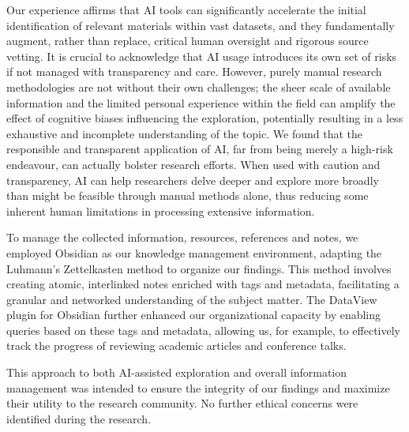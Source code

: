 Our experience affirms that AI tools can significantly accelerate the initial identification of relevant materials within vast datasets, and they fundamentally augment, rather than replace, critical human oversight and rigorous source vetting. It is crucial to acknowledge that AI usage introduces its own set of risks if not managed with transparency and care. However, purely manual research methodologies are not without their own challenges; the sheer scale of available information and the limited personal experience within the field can amplify the effect of cognitive biases\cite{cognitive-biases} influencing the exploration, potentially resulting in a less exhaustive and incomplete understanding of the topic. We found that the responsible and transparent application of AI, far from being merely a high-risk endeavour, can actually bolster research efforts. When used with caution and transparency, AI can help researchers delve deeper and explore more broadly than might be feasible through manual methods alone, thus reducing some inherent human limitations in processing extensive information.

To manage the collected information, resources, references and notes, we employed Obsidian as our knowledge management environment, adapting the Luhmann's Zettelkasten method\cite{Ahrens2017SmartNotes} to organize our findings. This method involves creating atomic, interlinked notes enriched with tags and metadata, facilitating a granular and networked understanding of the subject matter. The DataView plugin for Obsidian further enhanced our organizational capacity by enabling queries based on these tags and metadata, allowing us, for example, to effectively track the progress of reviewing academic articles and conference talks.

This approach to both AI-assisted exploration and overall information management was intended to ensure the integrity of our findings and maximize their utility to the research community. No further ethical concerns were identified during the research.